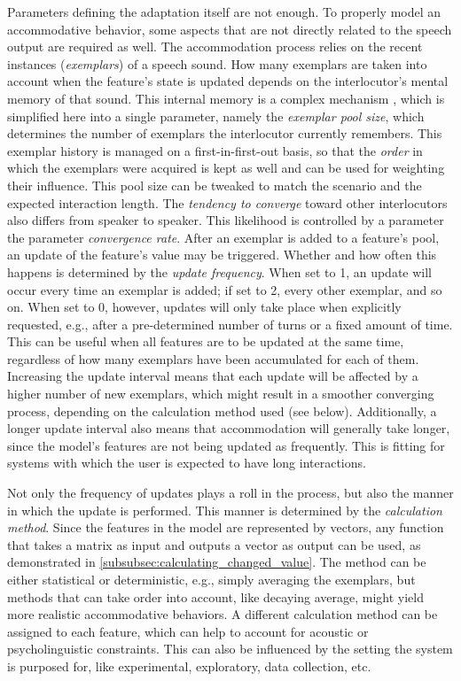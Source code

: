Parameters defining the adaptation itself are not enough.
To properly model an accommodative behavior, some aspects that are not directly related to the speech output are required as well.
The accommodation process relies on the recent instances (\emph{exemplars}) of a speech sound.
How many exemplars are taken into account when the feature's state is updated depends on the interlocutor's mental memory of that sound.
This internal memory is a complex mechanism \citep{Baddeley2003working}, which is simplified here into a single parameter, namely the \emph{exemplar pool size}, which determines the number of exemplars the interlocutor currently remembers.
This exemplar history is managed on a first-in-first-out basis, so that the \emph{order} in which the exemplars were acquired is kept as well and can be used for weighting their influence.
This pool size can be tweaked to match the scenario and the expected interaction length.
The \emph{tendency to converge} toward other interlocutors also differs from speaker to speaker.
This likelihood is controlled by a parameter the parameter \emph{convergence rate}.
After an exemplar is added to a feature's pool, an update of the feature's value may be triggered.
Whether and how often this happens is determined by the \emph{update frequency}.
When set to 1, an update will occur every time an exemplar is added; if set to 2, every other exemplar, and so on.
When set to 0, however, updates will only take place when explicitly requested, e.g., after a pre-determined number of turns or a fixed amount of time.
This can be useful when all features are to be updated at the same time, regardless of how many exemplars have been accumulated for each of them.
Increasing the update interval means that each update will be affected by a higher number of new exemplars, which might result in a smoother converging process, depending on the calculation method used (see below).
Additionally, a longer update interval also means that accommodation will generally take longer, since the model's features are not being updated as frequently.
This is fitting for systems with which the user is expected to have long interactions.

Not only the frequency of updates plays a roll in the process, but also the manner in which the update is performed.
This manner is determined by the \emph{calculation method}.
Since the features in the model are represented by vectors, any function that takes a matrix as input and outputs a vector as output can be used, as demonstrated in \cref{subsubsec:calculating_changed_value}.
The method can be either statistical or deterministic, e.g., simply averaging the exemplars, but methods that can take order into account, like decaying average, might yield more realistic accommodative behaviors.
A different calculation method can be assigned to each feature, which can help to account for acoustic or psycholinguistic constraints.
This can also be influenced by the setting the system is purposed for, like experimental, exploratory, data collection, etc.

